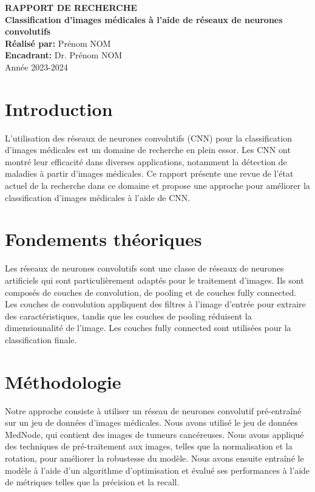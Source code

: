 \documentclass[12pt,a4paper]{report}
\begin{document}
\begin{titlepage}
    \centering
    {\Large\textbf{RAPPORT DE RECHERCHE}}\\[2cm]
    {\Huge\textbf{Classification d'images médicales à l'aide de réseaux de neurones convolutifs}}\\[3cm]
    \textbf{Réalisé par:} Prénom NOM\\[0.5cm]
    \textbf{Encadrant:} Dr. Prénom NOM\\[2cm]
    {\large Année 2023-2024}
\end{titlepage}

\tableofcontents
\newpage

\chapter{Introduction}
L'utilisation des réseaux de neurones convolutifs (CNN) pour la classification d'images médicales est un domaine de recherche en plein essor. Les CNN ont montré leur efficacité dans diverses applications, notamment la détection de maladies à partir d'images médicales. Ce rapport présente une revue de l'état actuel de la recherche dans ce domaine et propose une approche pour améliorer la classification d'images médicales à l'aide de CNN.

\chapter{Fondements théoriques}
Les réseaux de neurones convolutifs sont une classe de réseaux de neurones artificiels qui sont particulièrement adaptés pour le traitement d'images. Ils sont composés de couches de convolution, de pooling et de couches fully connected. Les couches de convolution appliquent des filtres à l'image d'entrée pour extraire des caractéristiques, tandis que les couches de pooling réduisent la dimensionnalité de l'image. Les couches fully connected sont utilisées pour la classification finale.

\chapter{Méthodologie}
Notre approche consiste à utiliser un réseau de neurones convolutif pré-entraîné sur un jeu de données d'images médicales. Nous avons utilisé le jeu de données MedNode, qui contient des images de tumeurs cancéreuses. Nous avons appliqué des techniques de pré-traitement aux images, telles que la normalisation et la rotation, pour améliorer la robustesse du modèle. Nous avons ensuite entraîné le modèle à l'aide d'un algorithme d'optimisation et évalué ses performances à l'aide de métriques telles que la précision et la recall.
\end{document}
